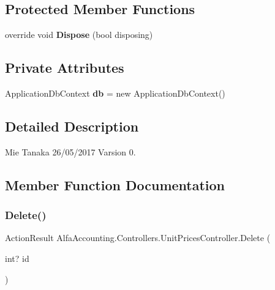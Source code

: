 \subsection*{Protected Member Functions}
\begin{DoxyCompactItemize}
\item 
\mbox{\label{class_alfa_accounting_1_1_controllers_1_1_unit_prices_controller_a6c80838d6f8d30184402983ea2ccb086}} 
override void {\bfseries Dispose} (bool disposing)
\end{DoxyCompactItemize}
\subsection*{Private Attributes}
\begin{DoxyCompactItemize}
\item 
\mbox{\label{class_alfa_accounting_1_1_controllers_1_1_unit_prices_controller_a42f637aa0faa83dabf2a5f55e893f08a}} 
Application\+Db\+Context {\bfseries db} = new Application\+Db\+Context()
\end{DoxyCompactItemize}


\subsection{Detailed Description}


Mie Tanaka 26/05/2017 Varsion 0. 

\subsection{Member Function Documentation}
\mbox{\label{class_alfa_accounting_1_1_controllers_1_1_unit_prices_controller_a19b58ab06090cba97611b12107d0ff69}} 
\subsubsection{\texorpdfstring{Delete()}{Delete()}}
{\footnotesize\ttfamily Action\+Result Alfa\+Accounting.\+Controllers.\+Unit\+Prices\+Controller.\+Delete (\begin{DoxyParamCaption}\item[{int?}]{id }\end{DoxyParamCaption})}



